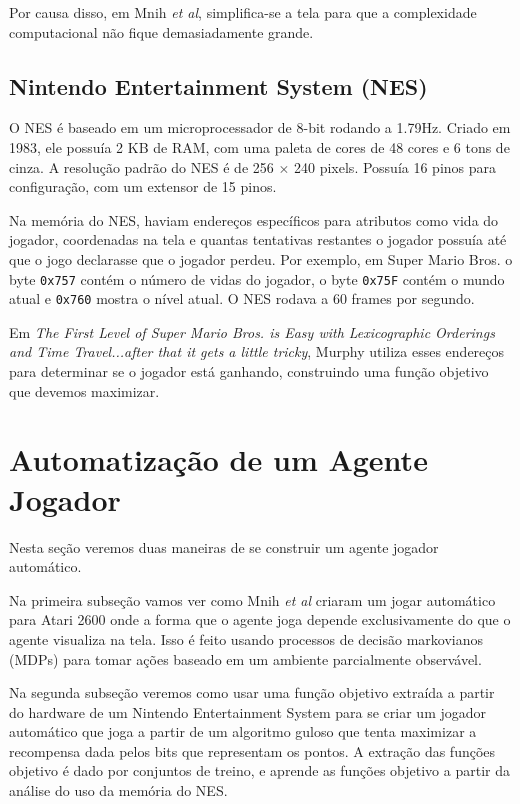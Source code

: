 \documentclass[a4paper,10pt]{article}
\theoremstyle{plain}
\begin{document}
Por causa disso, em Mnih \textit{et al}\cite{mnih-et-al}, simplifica-se a tela para que a
complexidade computacional não fique demasiadamente grande.

\subsection{Nintendo Entertainment System (NES)}

O NES é baseado em um microprocessador de 8-bit rodando a 1.79Hz. Criado em 1983, ele possuía 2 KB
de RAM, com uma paleta de cores de 48 cores e 6 tons de cinza. A resolução padrão do NES é de 256
$\times$ 240 pixels. Possuía 16 pinos para configuração, com um extensor de 15 pinos.

Na memória do NES, haviam endereços específicos para atributos como vida do jogador, coordenadas na
tela e quantas tentativas restantes o jogador possuía até que o jogo declarasse que o jogador
perdeu. Por exemplo, em Super Mario Bros. o byte \texttt{0x757} contém o número de vidas do
jogador, o byte \texttt{0x75F} contém o mundo atual e \texttt{0x760} mostra o nível atual. O NES
rodava a 60 frames por segundo.

Em \textit{The First Level of Super Mario Bros. is Easy with Lexicographic Orderings and Time
Travel...\small after that it gets a little tricky}, Murphy utiliza esses endereços para determinar
se o jogador está ganhando, construindo uma função objetivo que devemos maximizar.

\section{Automatização de um Agente Jogador}

Nesta seção veremos duas maneiras de se construir um agente jogador automático.

Na primeira subseção vamos ver como Mnih \textit{et al} criaram um jogar automático para Atari 2600
onde a forma que o agente joga depende exclusivamente do que o agente visualiza na tela. Isso é
feito usando processos de decisão markovianos (MDPs) para tomar ações baseado em um ambiente
parcialmente observável.

Na segunda subseção veremos como usar uma função objetivo extraída a partir do hardware de um
Nintendo Entertainment System para se criar um jogador automático que joga a partir de um algoritmo
guloso que tenta maximizar a recompensa dada pelos bits que representam os pontos. A extração das
funções objetivo é dado por conjuntos de treino, e aprende as funções objetivo a partir da análise
do uso da memória do NES.
\end{document}
